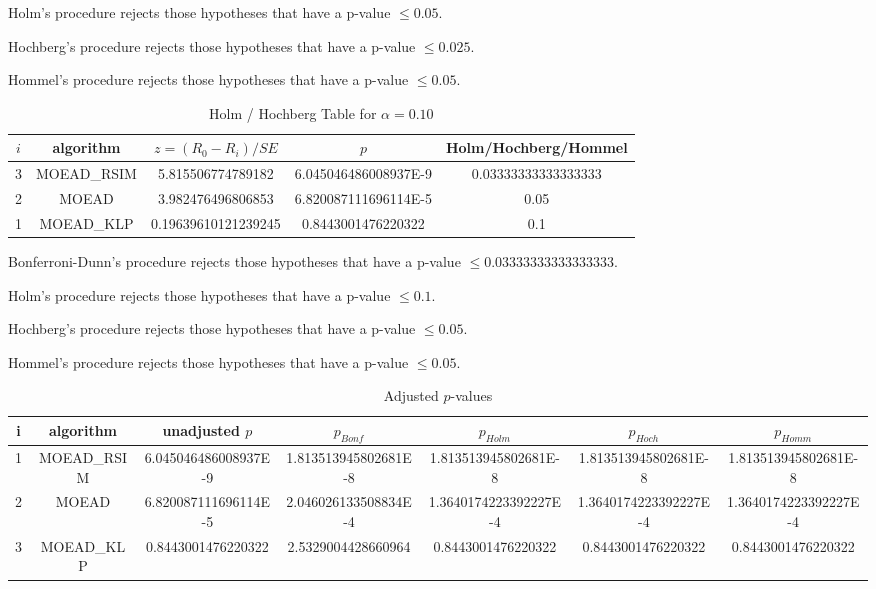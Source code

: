 \documentclass[a4paper,10pt]{article}
\begin{document}
\begin{landscape}
Holm's procedure rejects those hypotheses that have a p-value $\le0.05$.


Hochberg's procedure rejects those hypotheses that have a p-value $\le0.025$.


Hommel's procedure rejects those hypotheses that have a p-value $\le0.05$.


\begin{table}[!htp]
\centering\tiny
\caption{Holm / Hochberg Table for $\alpha=0.10$}
\begin{tabular}{ccccc}
$i$&algorithm&$z=(R_0 - R_i)/SE$&$p$&Holm/Hochberg/Hommel\\
\hline
3&MOEAD_RSIM&5.815506774789182&6.045046486008937E-9&0.03333333333333333\\
2&MOEAD&3.982476496806853&6.820087111696114E-5&0.05\\
1&MOEAD_KLP&0.19639610121239245&0.8443001476220322&0.1\\
\hline
\end{tabular}
\end{table}
Bonferroni-Dunn's procedure rejects those hypotheses that have a p-value $\le0.03333333333333333$.


Holm's procedure rejects those hypotheses that have a p-value $\le0.1$.


Hochberg's procedure rejects those hypotheses that have a p-value $\le0.05$.


Hommel's procedure rejects those hypotheses that have a p-value $\le0.05$.


\begin{table}[!htp]
\centering\tiny
\caption{Adjusted $p$-values}
\begin{tabular}{ccccccc}
i&algorithm&unadjusted $p$&$p_{Bonf}$&$p_{Holm}$&$p_{Hoch}$&$p_{Homm}$\\
\hline
1&MOEAD_RSIM&6.045046486008937E-9&1.813513945802681E-8&1.813513945802681E-8&1.813513945802681E-8&1.813513945802681E-8\\
2&MOEAD&6.820087111696114E-5&2.046026133508834E-4&1.3640174223392227E-4&1.3640174223392227E-4&1.3640174223392227E-4\\
3&MOEAD_KLP&0.8443001476220322&2.5329004428660964&0.8443001476220322&0.8443001476220322&0.8443001476220322\\
\hline
\end{tabular}
\end{table}


\end{landscape}
\end{document}
